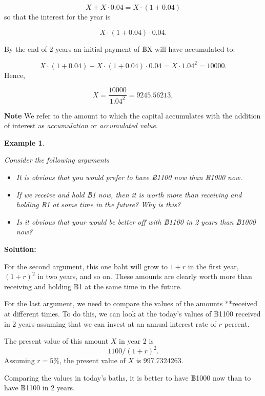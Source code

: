 \documentclass[landscape, 20pt]{extreport}
\theoremstyle{definition}
\theoremstyle{definition}
\newtheorem{example}{Example}[chapter]
\theoremstyle{definition}
\theoremstyle{definition}
\theoremstyle{remark}
\begin{document}
\[ X + X \cdot 0.04 = X \cdot (1 + 0.04)\] so that the interest for the
year is

\[ X \cdot (1 + 0.04) \cdot 0.04.\]

By the end of 2 years an initial payment of ฿X will have accumulated to:

\[X\cdot (1 + 0.04) + X \cdot (1 + 0.04) \cdot 0.04 =   X  \cdot  1.04^2 = 10000.\]
Hence,

\[X = \frac{10000}{1.04^2} = 9245.56213,\]

\textbf{Note} We refer to the amount to which the capital accumulates with
the addition of interest as \emph{accumulation} or \emph{accumulated value}.

\newpage \begin{example}
\protect\hypertarget{exm:unlabeled-div-2}{}\label{exm:unlabeled-div-2}

\emph{Consider the following arguments}

\begin{itemize}
\item
  \emph{It is obvious that you would prefer to have ฿1100 now than ฿1000
  now.}
\item
  \emph{If we receive and hold ฿1 now, then it is worth more than receiving
  and holding ฿1 at some time in the future? Why is this?}
\item
  \emph{Is it obvious that your would be better off with ฿1100 in 2 years
  than ฿1000 now?}
\end{itemize}

\end{example}

\textbf{Solution:}

For the second argument, this one baht will grow to \(1 + r\) in the first
year, \((1 + r)^2\) in two years, and so on. These amounts are clearly
worth more than receiving and holding ฿1 at the same time in the future.

For the last argument, we need to compare the values of the amounts
**received at different times. To do this, we can look at the today's
values of ฿1100 received in 2 years assuming that we can invest at an
annual interest rate of \(r\) percent.

The present value of this amount \(X\) in year 2 is \[ 1100/(1 + r)^2.\] Assuming \(r = 5\%\), the present value of \(X\) is 997.7324263.

Comparing the values in today's baths, it is better to
have ฿1000 now than to have ฿1100 in 2 years.
\end{document}
